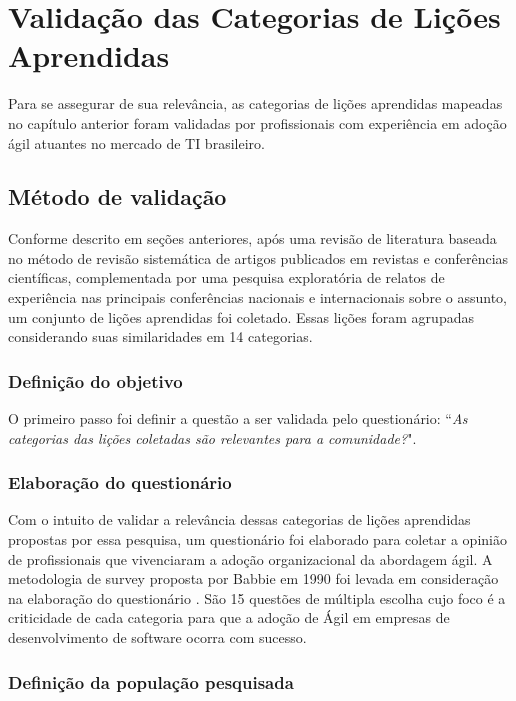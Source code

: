 \chapter{Validação das Categorias de Lições Aprendidas}

Para se assegurar de sua relevância, as categorias de lições aprendidas mapeadas no capítulo anterior foram validadas por profissionais com experiência em adoção ágil atuantes no mercado de TI brasileiro.

\section{Método de validação}

Conforme descrito em seções anteriores, após uma revisão de literatura baseada no método de revisão sistemática de artigos publicados em revistas e conferências científicas, complementada por  uma pesquisa exploratória de relatos de experiência nas principais conferências nacionais e internacionais sobre o assunto, um conjunto de lições aprendidas foi coletado. Essas lições foram agrupadas considerando suas similaridades em 14 categorias.

\subsection{Definição do objetivo}

O primeiro passo foi definir a questão a ser validada pelo questionário: ``\textit{As categorias das lições coletadas são relevantes para a comunidade?}".

\subsection{Elaboração do questionário}

Com o intuito de validar a relevância dessas categorias de lições aprendidas propostas por essa pesquisa, um questionário foi elaborado para coletar a opinião de profissionais que vivenciaram a adoção organizacional da abordagem ágil. A metodologia de survey proposta por Babbie em 1990 foi levada em consideração na elaboração do questionário \cite{Babbie1990}. São 15 questões de múltipla escolha cujo foco é a criticidade de cada categoria para que a adoção de Ágil em empresas de desenvolvimento de software ocorra com sucesso.

\subsection{Definição da população pesquisada}

